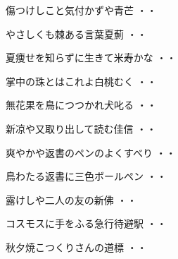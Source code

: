 \vspace{0.6cm}
\begin{shiika}傷つけしこと気付かずや青芒
\hfill{・・}\end{shiika}
\vspace{0.6cm}
\begin{shiika}やさしくも棘ある言葉夏薊
\hfill{・・}\end{shiika}
\vspace{0.6cm}
\begin{shiika}夏痩せを知らずに生きて米寿かな
\hfill{・・}\end{shiika}
\vspace{0.6cm}
\begin{shiika}掌中の珠とはこれよ白桃むく
\hfill{・・}\end{shiika}
\vspace{0.6cm}
\begin{shiika}無花果を鳥につつかれ犬叱る
\hfill{・・}\end{shiika}
\vspace{0.6cm}
\begin{shiika}新凉や又取り出して読む佳信
\hfill{・・}\end{shiika}
\vspace{0.6cm}
\begin{shiika}爽やかや返書のペンのよくすべり
\hfill{・・}\end{shiika}
\vspace{0.6cm}
\begin{shiika}鳥わたる返書に三色ボールペン
\hfill{・・}\end{shiika}
\vspace{0.6cm}
\begin{shiika}露けしや二人の友の新佛
\hfill{・・}\end{shiika}
\vspace{0.6cm}
\begin{shiika}コスモスに手をふる急行待避駅
\hfill{・・}\end{shiika}
\vspace{0.6cm}
\begin{shiika}秋夕焼こつくりさんの道標
\hfill{・・}\end{shiika}
